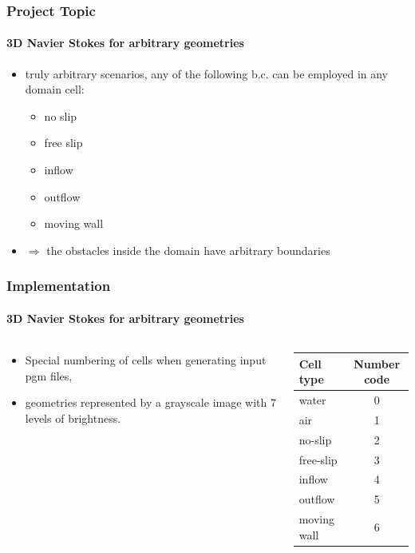 \documentclass{beamer}
\begin{document}
\begin{frame}
\frametitle{Project Topic}
\framesubtitle{3D Navier Stokes for arbitrary geometries}

\begin{itemize}
\item truly arbitrary scenarios, any of the following b.c. can be employed in any domain cell:
\begin{itemize}
\item no slip
\item free slip
\item inflow
\item outflow
\item moving wall
\end{itemize}
\item $\Rightarrow$ the obstacles inside the domain have arbitrary boundaries
\end{itemize}
\end{frame}

\begin{frame}
\frametitle{Implementation}
\framesubtitle{3D Navier Stokes for arbitrary geometries}
\begin{columns}
\begin{column}{0.48\textwidth}
\begin{itemize}
\item Special numbering of cells when generating input pgm files,
\item geometries represented by a grayscale image with 7 levels of brightness.
\end{itemize} 
\end{column}
\begin{column}{0.48\textwidth}
\begin{table}[ht!]
\flushleft
\label{tab1}
\begin{tabular}{|l|c|}
\hline
{\bf Cell type} & {\bf Number code}\\
\hline
water & 0 \\
air & 1 \\
no-slip & 2 \\
free-slip & 3 \\
inflow & 4 \\
outflow & 5 \\
moving wall & 6 \\
\hline
\end{tabular}
\end{table}
\end{column}
\end{columns}
\end{frame}
\end{document}
